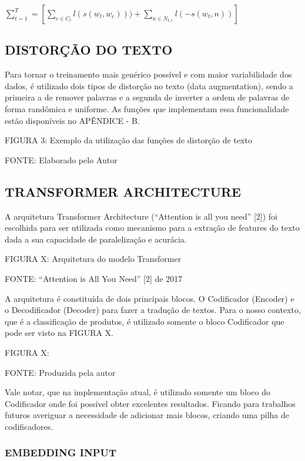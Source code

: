 \begin{center}\large
    $\sum_{t=1}^{T} = \left [ \sum_{c \in C_t} l(s(w_t, w_c))) + \sum_{n \in N_{t,c}} l(-s(w_t, n)) \right ]$
\end{center}

\subsection{DISTORÇÃO DO TEXTO}

Para tornar o treinamento mais genérico possível e com maior variabilidade dos dados, é utilizado dois tipos de distorção no texto (data augmentation), sendo a primeira a de remover palavras e a segunda de inverter a ordem de palavras de forma randômica e uniforme. As funções que implementam essa funcionalidade estão disponíveis no APÊNDICE - B.

FIGURA 3: Exemplo da utilização das funções de distorção de texto

FONTE: Elaborado pelo Autor

\subsection{TRANSFORMER ARCHITECTURE}

A arquitetura Transformer Architecture (“Attention is all you need” [2]) foi escolhida para ser utilizada como mecanismo para a extração de features do texto dada a sua capacidade de paralelização e acurácia.

FIGURA X: Arquitetura do modelo Transformer

FONTE: “Attention is All You Need” [2] de 2017

A arquitetura é constituída de dois principais blocos. O Codificador (Encoder) e o Decodificador (Decoder) para fazer a tradução de textos. Para o nosso contexto, que é a classificação de produtos, é utilizado somente o bloco Codificador que pode ser visto na FIGURA X.

FIGURA X: 

FONTE: Produzida pela autor

Vale notar, que na implementação atual, é utilizado somente um bloco do Codificador onde foi possível obter excelentes resultados. Ficando para trabalhos futuros averiguar a necessidade de adicionar mais blocos, criando uma pilha de codificadores.

\subsubsection{EMBEDDING INPUT}

